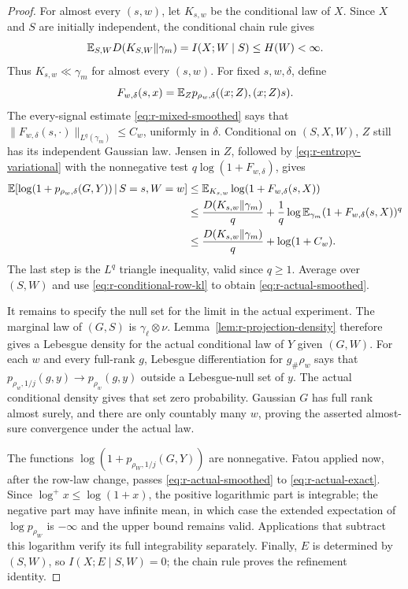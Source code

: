 \begin{proof}
For almost every \((s,w)\), let \(K_{s,w}\) be the conditional law
of \(X\).  Since \(X\) and \(S\) are initially independent, the
conditional chain rule gives
\begin{equation}\label{eq:r-conditional-row-kl}
 \mathbb E_{S,W}D(K_{S,W}\Vert\gamma_m)
   =I(X;W\mid S)\le H(W)<\infty.
\end{equation}
Thus \(K_{s,w}\ll\gamma_m\) for almost every \((s,w)\).
For fixed \(s,w,\delta\), define
\[
 F_{w,\delta}(s,x)=
   \mathbb E_Zp_{\rho_w,\delta}((x;Z),(x;Z)s).
\]
The every-signal estimate \eqref{eq:r-mixed-smoothed} says that
\(\|F_{w,\delta}(s,\cdot)\|_{L^q(\gamma_m)}\le C_w\), uniformly
in \(\delta\).  Conditional on \((S,X,W)\), \(Z\) still has its
independent Gaussian law.  Jensen in \(Z\), followed by
\eqref{eq:r-entropy-variational} with the nonnegative test
\(q\log(1+F_{w,\delta})\), gives
\begin{align*}
 \mathbb E\!\left[\log(1+p_{\rho_w,\delta}(G,Y))
             \,\middle|\,S=s,W=w\right]
 &\le \mathbb E_{K_{s,w}}\log(1+F_{w,\delta}(s,X))\\
 &\le \frac{D(K_{s,w}\Vert\gamma_m)}q
       +\frac1q\log\mathbb E_{\gamma_m}(1+F_{w,\delta}(s,X))^q\\
 &\le \frac{D(K_{s,w}\Vert\gamma_m)}q+\log(1+C_w).
\end{align*}
The last step is the \(L^q\) triangle inequality, valid since
\(q\ge1\).  Average over \((S,W)\) and use
\eqref{eq:r-conditional-row-kl} to obtain
\eqref{eq:r-actual-smoothed}.

It remains to specify the null set for the limit in the actual
experiment.  The marginal law of \((G,S)\) is
\(\gamma_\ell\otimes\nu\).  Lemma~\ref{lem:r-projection-density}
therefore gives a Lebesgue density for the actual conditional law
of \(Y\) given \((G,W)\).  For each \(w\) and every full-rank \(g\),
Lebesgue differentiation for \(g_\#\rho_w\) says that
\(p_{\rho_w,1/j}(g,y)\to p_{\rho_w}(g,y)\) outside a
Lebesgue-null set of \(y\).  The actual conditional density gives
that set zero probability.  Gaussian \(G\) has full rank almost
surely, and there are only countably many \(w\), proving the
asserted almost-sure convergence under the actual law.

The functions \(\log(1+p_{\rho_W,1/j}(G,Y))\) are nonnegative.
Fatou applied now, after the row-law change, passes
\eqref{eq:r-actual-smoothed} to \eqref{eq:r-actual-exact}.
Since \(\log^+x\le\log(1+x)\), the positive logarithmic part is
integrable; the negative part may have infinite mean, in which
case the extended expectation of \(\log p_{\rho_W}\) is
\(-\infty\) and the upper bound remains valid.  Applications
that subtract this logarithm verify its full integrability
separately.  Finally, \(E\) is determined by \((S,W)\), so
\(I(X;E\mid S,W)=0\); the chain rule proves the refinement identity.
\end{proof}

